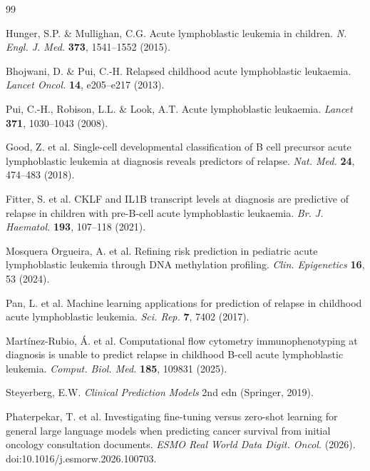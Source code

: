 \documentclass[pdflatex,sn-nature]{sn-jnl}
\begin{document}
\begin{thebibliography}{99}



Hunger, S.P. \& Mullighan, C.G.
Acute lymphoblastic leukemia in children.
\textit{N. Engl. J. Med.} \textbf{373}, 1541--1552 (2015).

Bhojwani, D. \& Pui, C.-H.
Relapsed childhood acute lymphoblastic leukaemia.
\textit{Lancet Oncol.} \textbf{14}, e205--e217 (2013).

Pui, C.-H., Robison, L.L. \& Look, A.T.
Acute lymphoblastic leukaemia.
\textit{Lancet} \textbf{371}, 1030--1043 (2008).

Good, Z. et al.
Single-cell developmental classification of B cell precursor acute
lymphoblastic leukemia at diagnosis reveals predictors of relapse.
\textit{Nat. Med.} \textbf{24}, 474--483 (2018).

Fitter, S. et al.
CKLF and IL1B transcript levels at diagnosis are predictive of
relapse in children with pre-B-cell acute lymphoblastic leukaemia.
\textit{Br. J. Haematol.} \textbf{193}, 107--118 (2021).

Mosquera Orgueira, A. et al.
Refining risk prediction in pediatric acute lymphoblastic leukemia
through DNA methylation profiling.
\textit{Clin. Epigenetics} \textbf{16}, 53 (2024).

Pan, L. et al.
Machine learning applications for prediction of relapse in childhood
acute lymphoblastic leukemia.
\textit{Sci. Rep.} \textbf{7}, 7402 (2017).

Mart\'inez-Rubio, \'{A}. et al.
Computational flow cytometry immunophenotyping at diagnosis is unable
to predict relapse in childhood B-cell acute lymphoblastic leukemia.
\textit{Comput. Biol. Med.} \textbf{185}, 109831 (2025).

Steyerberg, E.W.
\textit{Clinical Prediction Models} 2nd edn (Springer, 2019).

Phaterpekar, T. et al.
Investigating fine-tuning versus zero-shot learning for general large
language models when predicting cancer survival from initial oncology
consultation documents.
\textit{ESMO Real World Data Digit. Oncol.} (2026).
doi:10.1016/j.esmorw.2026.100703.


\end{thebibliography}
\end{document}
